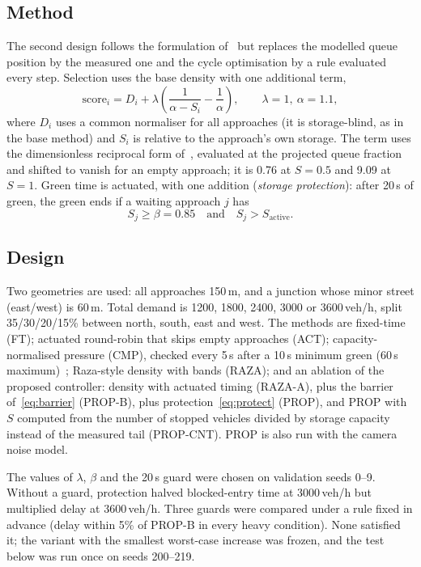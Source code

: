 \documentclass[conference]{IEEEtran}
\begin{document}
\subsection{Method}
The second design follows the formulation of~\cite{mohajerpoor2023} but replaces the
modelled queue position by the measured one and the cycle optimisation by a rule
evaluated every step. Selection uses the base density with one additional term,
\begin{equation}
\mathrm{score}_i = D_i+\lambda\left(\frac{1}{\alpha-S_i}-\frac{1}{\alpha}\right),
\qquad \lambda=1,\ \alpha=1.1 ,
\label{eq:barrier}
\end{equation}
where $D_i$ uses a common normaliser for all approaches (it is storage-blind, as in the
base method) and $S_i$ is relative to the approach's own storage. The term uses the dimensionless reciprocal form of~\cite{mohajerpoor2023}, evaluated at the projected queue fraction and shifted to vanish for an empty approach; it is 0.76 at $S=0.5$ and 9.09 at $S=1$. Green time is
actuated, with one addition (\emph{storage protection}): after 20\,s of green, the green
ends if a waiting approach $j$ has
\begin{equation}
S_j\ge\beta=0.85 \quad\text{and}\quad S_j>S_{\mathrm{active}} .
\label{eq:protect}
\end{equation}

\subsection{Design}
Two geometries are used: all approaches 150\,m, and a junction whose minor street
(east/west) is 60\,m. Total demand is 1200, 1800, 2400, 3000 or 3600\,veh/h, split
35/30/20/15\% between north, south, east and west. The methods are fixed-time (FT);
actuated round-robin that skips empty approaches (ACT); capacity-normalised pressure (CMP), checked every 5\,s after a 10\,s minimum green (60\,s maximum)~\cite{gregoire2015}; Raza-style density with bands (RAZA); and an
ablation of the proposed controller: density with actuated timing (RAZA-A), plus the
barrier of~\eqref{eq:barrier} (PROP-B), plus protection~\eqref{eq:protect} (PROP), and
PROP with $S$ computed from the number of stopped vehicles divided by storage capacity
instead of the measured tail (PROP-CNT). PROP is also run with the camera noise model.

The values of $\lambda$, $\beta$ and the 20\,s guard were chosen on validation seeds
0--9. Without a guard, protection halved blocked-entry time at 3000\,veh/h but
multiplied delay at 3600\,veh/h. Three guards were compared under a rule fixed in
advance (delay within 5\% of PROP-B in every heavy condition). None satisfied it; the
variant with the smallest worst-case increase was frozen, and the test below was run
once on seeds 200--219.
\end{document}

